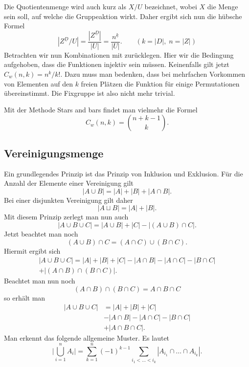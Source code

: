 \documentclass[a4paper,12pt,fleqn]{article}
\begin{document}
Die Quotientenmenge wird auch kurz als $X/U$ bezeichnet,
wobei $X$ die Menge sein soll, auf welche die Gruppeaktion wirkt.
Daher ergibt sich nun die hübsche Formel
\begin{equation}
|Z^{\underline D}/U| = \frac{|Z^{\underline D}|}{|U|}
= \frac{n^{\underline k}}{|U|}.\qquad(k=|D|,\;n=|Z|)
\end{equation}
%
Betrachten wir nun Kombinationen mit zurücklegen.
Hier wir die Bedingung aufgehoben, dass die Funktionen injektiv
sein müssen. Keinenfalls gilt jetzt $C_w(n,k)=n^k/k!$. Dazu
muss man bedenken, dass bei mehrfachen Vorkommen von Elementen
auf den $k$ freien Plätzen die Funktion für einige Permutationen
übereinstimmt. Die Fixgruppe ist also nicht mehr trivial.

Mit der Methode {\glqq}Stars and bars{\grqq} findet man vielmehr
die Formel
\begin{equation}
C_w(n,k) = \binom{n+k-1}{k}.
\end{equation}

\subsection{Vereinigungsmenge}
Ein grundlegendes Prinzip ist das Prinzip von Inklusion und
Exklusion. Für die Anzahl der Elemente einer Vereinigung
gilt
\begin{equation}
|A\cup B| = |A|+|B|+|A\cap B|.
\end{equation}
Bei einer disjunkten Vereinigung gilt daher
\[|A\sqcup B| = |A|+|B|.\]
Mit diesem Prinzip zerlegt man nun auch
\[|A\cup B\cup C| = |A\cup B|+|C|-|(A\cup B)\cap C|.\]
Jetzt beachtet man noch
\[(A\cup B)\cap C = (A\cap C)\cup(B\cap C).\]
Hiermit ergibt sich
\begin{gather*}
|A\cup B\cup C| = |A|+|B|+|C|-|A\cap B|-|A\cap C|-|B\cap C|\\
+|(A\cap B)\cap (B\cap C)|.
\end{gather*}
Beachtet man nun noch
\[(A\cap B)\cap (B\cap C) = A\cap B\cap C\]
so erhält man
\begin{equation}
\begin{split}
|A\cup B\cup C| &= |A|+|B|+|C|\\
&-|A\cap B|-|A\cap C|-|B\cap C|\\
&+|A\cap B\cap C|.
\end{split}
\end{equation}
Man erkennt das folgende allgemeine Muster. Es lautet
\begin{equation}
\bigg|\bigcup_{i=1}^n A_i\bigg|
= \sum_{k=1}^n (-1)^{k-1} \sum_{i_1<\ldots<i_k}
|A_{i_1}\cap\ldots\cap A_{i_k}|.
\end{equation}
\end{document}
